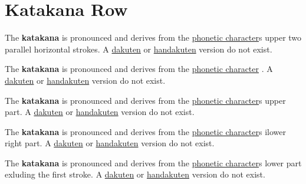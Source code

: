 \section{Katakana  Row}\label{sec:KatakanaMaRow}


\label{letter:ma} The  \textbf{katakana}  is
pronounced  and derives from the
\hyperref[sec:PhoneticCharacter]{phonetic character}s  upper
two parallel horizontal strokes.  A \hyperref[sec:Dakuten]{dakuten} or
\hyperref[sec:Handakuten]{handakuten} version do not exist.

\label{letter:mi} The  \textbf{katakana}  is
pronounced  and derives from the
\hyperref[sec:PhoneticCharacter]{phonetic character} .  A
\hyperref[sec:Dakuten]{dakuten} or \hyperref[sec:Handakuten]{handakuten}
version do not exist.

\label{letter:mu} The  \textbf{katakana}  is
pronounced  and derives from the
\hyperref[sec:PhoneticCharacter]{phonetic character}s 
upper part.  A \hyperref[sec:Dakuten]{dakuten} or
\hyperref[sec:Handakuten]{handakuten} version do not exist.

\newpage

\label{letter:me} The  \textbf{katakana}  is
pronounced  and derives from the
\hyperref[sec:PhoneticCharacter]{phonetic character}s 
ilower right part.  A \hyperref[sec:Dakuten]{dakuten} or
\hyperref[sec:Handakuten]{handakuten} version do not exist.



\label{letter:mo} The  \textbf{katakana}  is
pronounced  and derives from the
\hyperref[sec:PhoneticCharacter]{phonetic character}s  lower
part exluding the first stroke.  A \hyperref[sec:Dakuten]{dakuten} or
\hyperref[sec:Handakuten]{handakuten} version do not exist.

\newpage

\subsection{} \label{sec:KatakanaMa}

